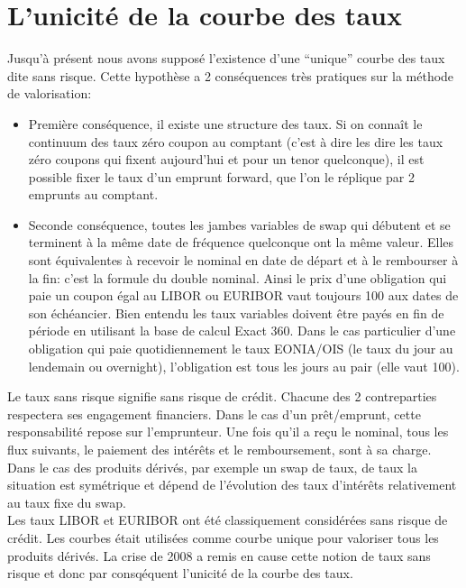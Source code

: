 \documentclass{article}
\begin{document}
\section*{L'unicité de la courbe des taux}

Jusqu’à présent nous avons supposé l’existence d’une “unique” courbe des taux dite sans risque. Cette hypothèse a 2 conséquences très pratiques sur la méthode de valorisation:\\
\begin{itemize}

\item Première conséquence, il existe une structure des taux. Si on connaît le continuum des taux zéro coupon au comptant (c’est à dire les dire les taux zéro coupons qui fixent aujourd’hui et pour un tenor quelconque), il est possible fixer le taux d’un emprunt forward, que l'on le réplique par 2 emprunts au comptant.\\

\item Seconde conséquence, toutes les jambes variables de swap qui débutent et se terminent à la même date de fréquence quelconque ont la même valeur. Elles sont équivalentes à recevoir le nominal en date de départ et à le rembourser à la fin: c’est la formule du double nominal. Ainsi le prix d’une obligation qui paie un coupon égal au LIBOR ou EURIBOR vaut toujours 100 aux dates de son échéancier. Bien entendu les taux variables doivent être payés en fin de période en utilisant la base de calcul Exact 360. Dans le cas particulier d’une obligation qui paie quotidiennement le taux EONIA/OIS (le taux du jour au lendemain ou overnight), l’obligation est tous les jours au pair (elle vaut 100).\\ 

\end{itemize}

Le taux sans risque signifie sans risque de crédit. Chacune des 2 contreparties respectera ses engagement financiers. Dans le cas d’un prêt/emprunt, cette responsabilité repose sur l’emprunteur. Une fois qu’il a reçu le nominal, tous les flux suivants, le paiement des intérêts et le remboursement, sont à sa charge. Dans le cas des produits dérivés, par exemple un swap de taux, de taux la situation est symétrique et dépend de l’évolution des taux d’intérêts relativement au taux fixe du swap.\\

Les taux LIBOR et EURIBOR ont été classiquement considérées sans risque de crédit. Les courbes était utilisées comme courbe unique pour valoriser tous les produits dérivés. La crise de 2008 a remis en cause cette notion de taux sans risque et donc par consqéquent l’unicité de la courbe des taux.\\
\end{document}
